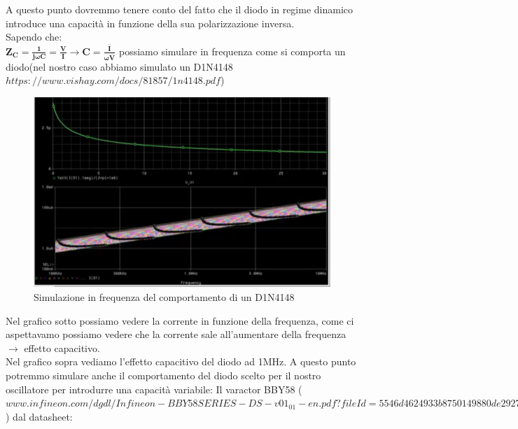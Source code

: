 \documentclass{article}
\begin{document}
A questo punto dovremmo tenere conto del fatto che il diodo in regime dinamico introduce una capacità in funzione della sua polarizzazione inversa.\\
Sapendo che:\\  \Large$\bm{Z_C=\frac{1}{j \omega C}=\frac{V}{I} \rightarrow C=\frac{\bar{I}}{\omega \bar{V}}}$ \normalsize possiamo simulare in frequenza come si comporta un diodo(nel nostro caso abbiamo simulato un D1N4148 $https://www.vishay.com/docs/81857/1n4148.pdf$)
~\begin{figure}[H]
\includegraphics[width=\textwidth]{D1N4148.png}
\centering
\caption{Simulazione in frequenza del comportamento di un D1N4148}
\label{fig:foo}
\end{figure}
Nel grafico sotto possiamo vedere la corrente in funzione della frequenza, come ci aspettavamo possiamo vedere che la corrente sale all'aumentare della frequenza $\rightarrow$ effetto capacitivo.\\Nel grafico sopra vediamo l'effetto capacitivo del diodo ad 1MHz.
A questo punto potremmo simulare anche il comportamento del diodo scelto per il nostro oscillatore per introdurre una capacità variabile:  Il varactor BBY58 ($www.infineon.com/dgdl/Infineon-BBY58SERIES-DS-v01_01-en.pdf?fileId=5546d4624933b8750149880de2927e14$) dal datasheet: 
\end{document}

